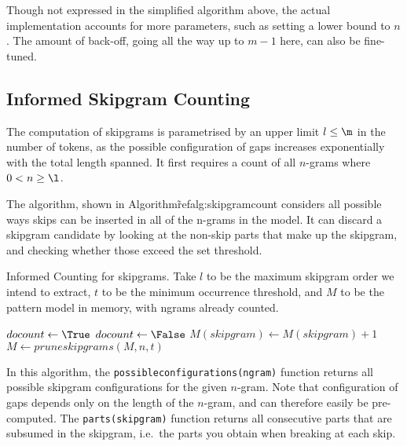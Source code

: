 Though not expressed in the simplified algorithm above, the actual
implementation accounts for more parameters, such as setting a lower bound to
$n$. The amount of back-off, going all the way up to $m-1$ here, can also be
fine-tuned.

\subsection{Informed Skipgram Counting}
\label{sec:skipgramcount}

The computation of skipgrams is parametrised by an upper limit $l\leq\m$ in the number of
tokens, as the possible configuration of gaps increases exponentially with the
total length spanned. It first requires a count of all $n$-grams where $0<n\geq\l$. 

The algorithm, shown in Algorithm\~ref{alg:skipgramcount} considers all
possible ways skips can be inserted in all of the n-grams in the model. It can
discard a skipgram candidate by looking at the non-skip parts that make up the
skipgram, and checking whether those exceed the set threshold. 

\begin{algorithm} \caption{Informed Counting for skipgrams.  Take $l$
to be the maximum skipgram order we intend to extract, $t$ to be the minimum occurrence threshold, and $M$ to be the
pattern model in memory, with ngrams already counted.}
\label{alg:skipgramcount}
\begin{algorithmic}
            \State $docount \leftarrow \True$
                    \State $docount \leftarrow \False$
                    \Break
                \EndIf
            \EndFor 
                \State $M(skipgram) \leftarrow M(skipgram) + 1$
            \EndIf
        \EndFor 
    \EndFor
  \EndFor
  \State $M \leftarrow pruneskipgrams(M,n,t)$
\EndFor \\
\end{algorithmic}
\end{algorithm}

In this algorithm, the \texttt{possibleconfigurations(ngram)} function returns
all possible skipgram configurations for the given $n$-gram. Note that
configuration of gaps depends only on the length of the $n$-gram, and can
therefore easily be pre-computed. The \texttt{parts(skipgram)} function returns
all consecutive parts that are subsumed in the skipgram, i.e.\ the parts you
obtain when breaking at each skip.

